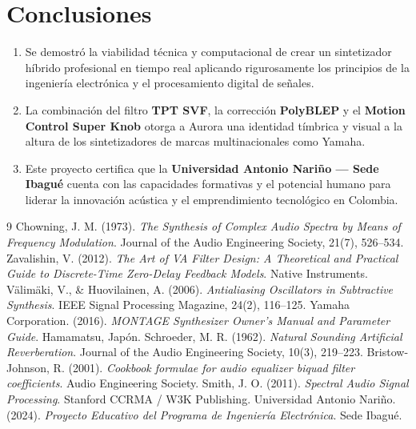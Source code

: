 \documentclass[11pt,a4paper]{article}
\begin{document}
\section{Conclusiones}

\begin{enumerate}
    \item Se demostró la viabilidad técnica y computacional de crear un sintetizador híbrido profesional en tiempo real aplicando rigurosamente los principios de la ingeniería electrónica y el procesamiento digital de señales.
    \item La combinación del filtro \textbf{TPT SVF}, la corrección \textbf{PolyBLEP} y el \textbf{Motion Control Super Knob} otorga a Aurora una identidad tímbrica y visual a la altura de los sintetizadores de marcas multinacionales como Yamaha.
    \item Este proyecto certifica que la \textbf{Universidad Antonio Nariño — Sede Ibagué} cuenta con las capacidades formativas y el potencial humano para liderar la innovación acústica y el emprendimiento tecnológico en Colombia.
\end{enumerate}

\newpage
\begin{thebibliography}{9}
 Chowning, J. M. (1973). \textit{The Synthesis of Complex Audio Spectra by Means of Frequency Modulation}. Journal of the Audio Engineering Society, 21(7), 526–534.
 Zavalishin, V. (2012). \textit{The Art of VA Filter Design: A Theoretical and Practical Guide to Discrete-Time Zero-Delay Feedback Models}. Native Instruments.
 Välimäki, V., \& Huovilainen, A. (2006). \textit{Antialiasing Oscillators in Subtractive Synthesis}. IEEE Signal Processing Magazine, 24(2), 116–125.
 Yamaha Corporation. (2016). \textit{MONTAGE Synthesizer Owner's Manual and Parameter Guide}. Hamamatsu, Japón.
 Schroeder, M. R. (1962). \textit{Natural Sounding Artificial Reverberation}. Journal of the Audio Engineering Society, 10(3), 219–223.
 Bristow-Johnson, R. (2001). \textit{Cookbook formulae for audio equalizer biquad filter coefficients}. Audio Engineering Society.
 Smith, J. O. (2011). \textit{Spectral Audio Signal Processing}. Stanford CCRMA / W3K Publishing.
 Universidad Antonio Nariño. (2024). \textit{Proyecto Educativo del Programa de Ingeniería Electrónica}. Sede Ibagué.
\end{thebibliography}
\end{document}

